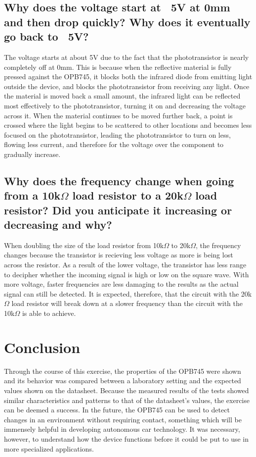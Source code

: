 \documentclass[conference]{IEEEtran}
\begin{document}
\subsection{Why does the voltage start at ~5V at 0mm and then drop quickly? Why does it eventually go
back to ~5V?}

The voltage starts at about 5V due to the fact that the
phototransistor is nearly completely off at 0mm. This is
because when the reflective material is fully pressed against
the OPB745, it blocks both the infrared diode from emitting
light outside the device, and blocks the phototransistor from
receiving any light. Once the material is moved back a small amount, the
infrared light can be reflected most effectively to the
phototransistor, turning it on and decreasing the voltage
across it. When the material continues to be moved further 
back, a point is crossed where the light begins to be scattered
to other locations and becomes less focused on the
phototransistor, leading the phototransistor to turn on less,
flowing less current, and therefore for the voltage over the
component to gradually increase.

\subsection{Why does the frequency change when going from a 10k$\Omega$ load resistor to a 20k$\Omega$ load resistor?
Did you anticipate it increasing or decreasing and why?}

When doubling the size of the load resistor from 10k$\Omega$  to 20k$\Omega$, the frequency changes because the transistor is recieving less voltage as more is being lost across the resistor. As a result of the lower voltage, the transistor has less range to decipher whether the incoming signal is high or low on the square wave. With more voltage, faster frequencies are less damaging to the results as the actual signal can still be detected. It is expected, therefore, that the circuit with the 20k$\Omega$ load resistor will break down at a slower frequency than the circuit with the 10k$\Omega$ is able to achieve.

\section{Conclusion}
Through the course of this exercise, the properties of the OPB745 were shown and its behavior was compared between a laboratory setting and the expected values shown on the datasheet. Because the measured results of the tests showed similar characteristics and patterns to that of the datasheet's values, the exercise can be deemed a success. In the future, the OPB745 can be used to detect changes in an environment without requiring contact, something which will be immensely helpful in developing autonomous car technology. It was necessary, however, to understand how the device functions before it could be put to use in more specialized applications.
\end{document}
